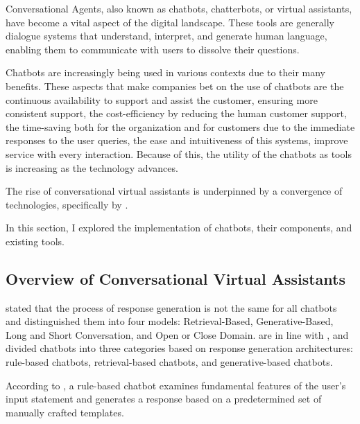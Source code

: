 Conversational Agents, also known as chatbots, chatterbots, or virtual assistants, have become a vital aspect of the digital landscape. These tools are generally dialogue systems that understand, interpret, and generate human language, enabling them to communicate with users to dissolve their questions.

Chatbots are increasingly being used in various contexts due to their many benefits. 
These aspects that make companies bet on the use of chatbots are the continuous availability to support and assist the customer, ensuring more consistent support, the cost-efficiency by reducing the human customer support, the time-saving both for the organization and for customers due to the immediate responses to the user queries, the ease and intuitiveness of this systems, improve service with every interaction. Because of this, the utility of the chatbots as tools is increasing as the technology advances. 

The rise of conversational virtual assistants is underpinned by a convergence of technologies, specifically by {\llm}.

In this section, I explored the implementation of chatbots, their components, and existing tools. %


\subsection{Overview of Conversational Virtual Assistants}



\citet{borah_survey_2019} stated that the process of response generation is not the same for all chatbots and distinguished them into four models: Retrieval-Based, Generative-Based, Long and Short Conversation, and Open or Close Domain. \citet{chizhik_challenges_2020} are in line with \citet{borah_survey_2019}, and divided chatbots into three categories based on response generation architectures: rule-based chatbots, retrieval-based chatbots, and generative-based chatbots.

According to \citet{chizhik_challenges_2020}, a rule-based chatbot examines fundamental features of the user's input statement and generates a response based on a predetermined set of manually crafted templates.

